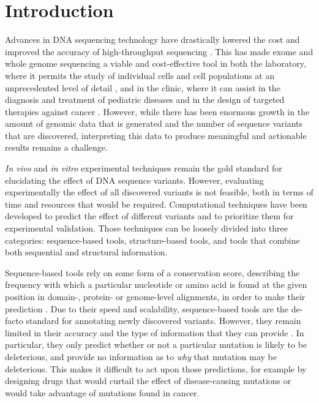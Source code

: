 
\chapter{Introduction} \label{ch:introduction}

Advances in DNA sequencing technology have drastically lowered the cost and improved the accuracy of high-throughput sequencing \cite{wetterstrand_dna_2016}. This has made exome and whole genome sequencing a viable and cost-effective tool in both the laboratory, where it permits the study of individual cells and cell populations at an unprecedented level of detail \cite{eberwine_promise_2014}, and in the clinic, where it can assist in the diagnosis and treatment of pediatric diseases \cite{chrystoja_whole_2014} and in the design of targeted therapies against cancer \cite{nik-zainal_landscape_2016}. However, while there has been enormous growth in the amount of genomic data that is generated and the number of sequence variants that are discovered, interpreting this data to produce meaningful and actionable results remains a challenge.

\textit{In vivo} and \textit{in vitro} experimental techniques remain the gold standard for elucidating the effect of DNA sequence variants. However, evaluating experimentally the effect of all discovered variants is not feasible, both in terms of time and resources that would be required. Computational techniques have been developed to predict the effect of different variants and to prioritize them for experimental validation. Those techniques can be loosely divided into three categories: sequence-based tools, structure-based tools, and tools that combine both sequential and structural information.

Sequence-based tools rely on some form of a conservation score, describing the frequency with which a particular nucleotide or amino acid is found at the given position in domain-, protein- or genome-level alignments, in order to make their prediction \cite{ng_sift:_2003,adzhubei_predicting_2001,li_automated_2009,network_integrated_2011,kircher_general_2014,shihab_ranking_2014,choi_predicting_2012}. Due to their speed and scalability, sequence-based tools are the de-facto standard for annotating newly discovered variants. However, they remain limited in their accuracy and the type of information that they can provide \cite{dorfman_common_2010}. In particular, they only predict whether or not a particular mutation is likely to be deleterious, and provide no information as to \textit{why} that mutation may be deleterious. This makes it difficult to act upon those predictions, for example by designing drugs that would curtail the effect of disease-causing mutations or would take advantage of mutations found in cancer.

